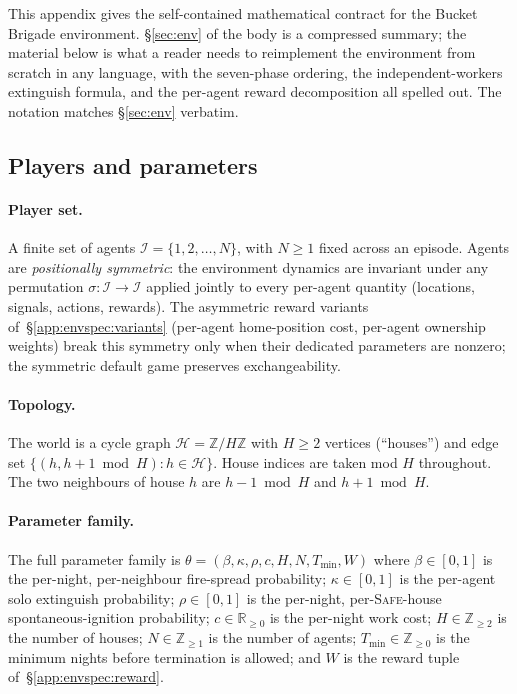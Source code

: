 \documentclass{anvil-paper}
\begin{document}
This appendix gives the self-contained mathematical contract for the Bucket
Brigade environment. \S\ref{sec:env} of the body is a compressed summary;
the material below is what a reader needs to reimplement the environment
from scratch in any language, with the seven-phase ordering, the
independent-workers extinguish formula, and the per-agent reward
decomposition all spelled out. The notation matches \S\ref{sec:env}
verbatim.

\subsection{Players and parameters}
\label{app:envspec:setup}

\paragraph{Player set.} A finite set of agents
$\mathcal{I}=\{1,2,\ldots,N\}$, with $N\geq 1$ fixed across an episode.
Agents are \emph{positionally symmetric}: the environment dynamics are
invariant under any permutation $\sigma:\mathcal{I}\to\mathcal{I}$ applied
jointly to every per-agent quantity (locations, signals, actions,
rewards). The asymmetric reward variants of~\S\ref{app:envspec:variants}
(per-agent home-position cost, per-agent ownership weights) break this
symmetry only when their dedicated parameters are nonzero; the symmetric
default game preserves exchangeability.

\paragraph{Topology.} The world is a cycle graph
$\mathcal{H}=\mathbb{Z}/H\mathbb{Z}$ with $H\geq 2$ vertices (``houses'')
and edge set $\{(h,h{+}1\bmod H):h\in\mathcal{H}\}$. House indices are
taken mod $H$ throughout. The two neighbours of house $h$ are
$h{-}1\bmod H$ and $h{+}1\bmod H$.

\paragraph{Parameter family.} The full parameter family is
$\theta=(\beta,\kappa,\rho,c,H,N,T_{\min},W)$ where $\beta\in[0,1]$ is the
per-night, per-neighbour fire-spread probability; $\kappa\in[0,1]$ is the
per-agent solo extinguish probability; $\rho\in[0,1]$ is the per-night,
per-\textsc{Safe}-house spontaneous-ignition probability; $c\in\mathbb{R}_{\geq 0}$
is the per-night work cost; $H\in\mathbb{Z}_{\geq 2}$ is the number of
houses; $N\in\mathbb{Z}_{\geq 1}$ is the number of agents;
$T_{\min}\in\mathbb{Z}_{\geq 0}$ is the minimum nights before termination
is allowed; and $W$ is the reward tuple of~\S\ref{app:envspec:reward}.
\end{document}
